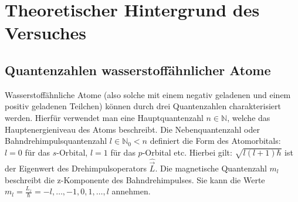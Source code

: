 \section{Theoretischer Hintergrund des Versuches}
\label{sec:Theorie}

\subsection{Quantenzahlen wasserstoffähnlicher Atome}
\label{subsec:quantenzahlen}
Wasserstoffähnliche Atome (also solche mit einem negativ geladenen und einem
positiv geladenen Teilchen) können durch drei Quantenzahlen charakterisiert
werden. Hierfür verwendet man eine Hauptquantenzahl $n \in \mathbb{N}$, welche das
Hauptenergieniveau des Atoms beschreibt. Die Nebenquantenzahl oder
Bahndrehimpulsquantenzahl $l \in \mathbb{N}_{0} < n$ definiert die Form des
Atomorbitals: $l=0$ für das $s$-Orbital, $l=1$ für das $p$-Orbital etc.
Hierbei gilt: $\sqrt{l(l+1) \hbar}$ ist der Eigenwert des Drehimpulsoperators
$\hat{\vec{L}}$. Die magnetische Quantenzahl $m_{l}$ beschreibt die
z-Komponente des Bahndrehimpulses. Sie kann die Werte
$m_{l} = \frac{L_{z}}{\hbar} = -l,\ldots,-1,0,1,\ldots,l$ annehmen.

